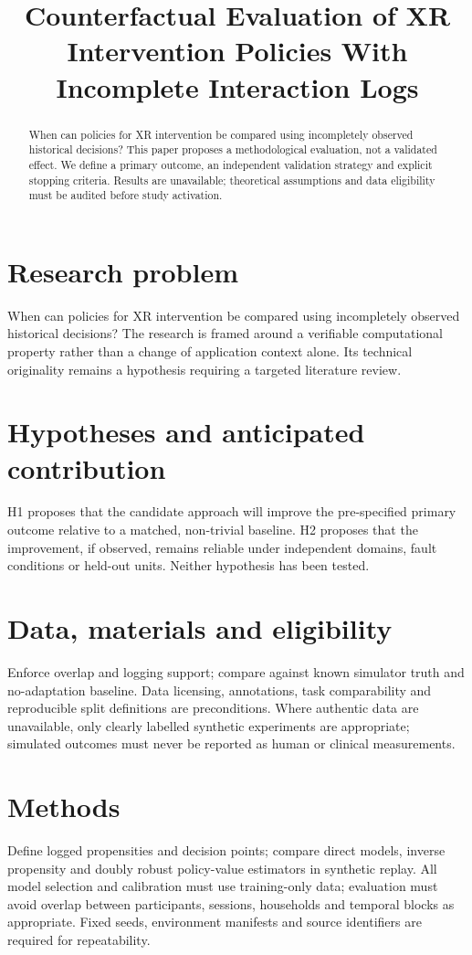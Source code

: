 \documentclass[11pt,a4paper]{article}
\title{Counterfactual Evaluation of XR Intervention Policies With Incomplete Interaction Logs}
\author{}
\date{}
\begin{document}
\maketitle
\begin{abstract}
When can policies for XR intervention be compared using incompletely observed historical decisions? This paper proposes a methodological evaluation, not a validated effect. We define a primary outcome, an independent validation strategy and explicit stopping criteria. Results are unavailable; theoretical assumptions and data eligibility must be audited before study activation.
\end{abstract}
\section{Research problem}
When can policies for XR intervention be compared using incompletely observed historical decisions? The research is framed around a verifiable computational property rather than a change of application context alone. Its technical originality remains a hypothesis requiring a targeted literature review.
\section{Hypotheses and anticipated contribution}
H1 proposes that the candidate approach will improve the pre-specified primary outcome relative to a matched, non-trivial baseline. H2 proposes that the improvement, if observed, remains reliable under independent domains, fault conditions or held-out units. Neither hypothesis has been tested.
\section{Data, materials and eligibility}
Enforce overlap and logging support; compare against known simulator truth and no-adaptation baseline. Data licensing, annotations, task comparability and reproducible split definitions are preconditions. Where authentic data are unavailable, only clearly labelled synthetic experiments are appropriate; simulated outcomes must never be reported as human or clinical measurements.
\section{Methods}
Define logged propensities and decision points; compare direct models, inverse propensity and doubly robust policy-value estimators in synthetic replay. All model selection and calibration must use training-only data; evaluation must avoid overlap between participants, sessions, households and temporal blocks as appropriate. Fixed seeds, environment manifests and source identifiers are required for repeatability.
\end{document}
